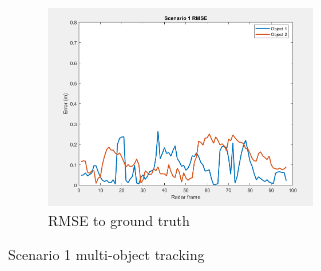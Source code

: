 \begin{figure}[!htb]
    \begin{subfigure}[b]{0.475\textwidth}%
        \includegraphics[width=7cm]{Figures/RMSE1.png}
        \caption{RMSE to ground truth}
        \label{subfig:RMSE_1}
    \end{subfigure}

    \caption{Scenario 1 multi-object tracking}
    \label{fig:scenario_result_1}
\end{figure}

